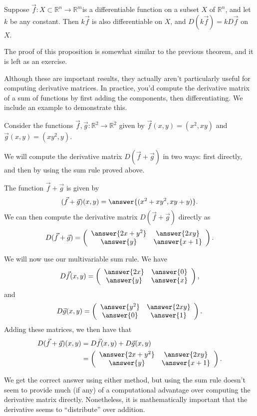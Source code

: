 \documentclass{ximera}
\begin{document}
\begin{proposition}
Suppose $\vec{f}:X\subset \mathbb{R}^n\rightarrow \mathbb{R}^m$is a differentiable function on a subset $X$ of $\mathbb{R}^n$, and let $k$ be any constant. Then $k\vec{f}$ is also differentiable on $X$, and $D(k\vec{f})=kD\vec{f}$ on $X$.
\end{proposition}

The proof of this proposition is somewhat similar to the previous theorem, and it is left as an exercise.

Although these are important results, they actually aren't particularly useful for computing derivative matrices. In practice, you'd compute the derivative matrix of a sum of functions by first adding the components, then differentiating. We include an example to demonstrate this.

\begin{example}
Consider the functions $\vec{f},\vec{g}:\mathbb{R}^2\rightarrow\mathbb{R}^2$ given by $\vec{f}(x,y) = (x^2, xy)$ and $\vec{g}(x,y) = (xy^2, y)$.

We will compute the derivative matrix $D(\vec{f}+\vec{g})$ in two ways: first directly, and then by using the sum rule proved above.

The function $\vec{f}+\vec{g}$ is given by
\[
(\vec{f}+\vec{g})(x,y) = \answer{(x^2+xy^2, xy+y)}.
\]
We can then compute the derivative matrix $D(\vec{f}+\vec{g})$ directly as 
\[
D(\vec{f}+\vec{g})=\left(\begin{array}{cc} \answer{2x+y^2} & \answer{2xy}\\\answer{y} & \answer{x+1}\end{array}\right).
\]

We will now use our multivariable sum rule.
We have
\[
D\vec{f}(x,y) = \left(\begin{array}{cc} \answer{2x} & \answer{0}\\\answer{y} & \answer{x}\end{array}\right),
\]
and 
\[
D\vec{g}(x,y) = \left(\begin{array}{cc} \answer{y^2} & \answer{2xy}\\\answer{0} & \answer{1}\end{array}\right).
\]
Adding these matrices, we then have that
\begin{align*}
D(\vec{f}+\vec{g})(x,y) &= D\vec{f}(x,y)+D\vec{g}(x,y)\\
&= \left(\begin{array}{cc} \answer{2x+y^2} & \answer{2xy}\\\answer{y} & \answer{x+1}\end{array}\right).
\end{align*}

We get the correct answer using either method, but using the sum rule doesn't seem to provide much (if any) of a computational advantage over computing the derivative matrix directly. Nonetheless, it is mathematically important that the derivative seems to ``distribute'' over addition.
\end{example}
\end{document}
